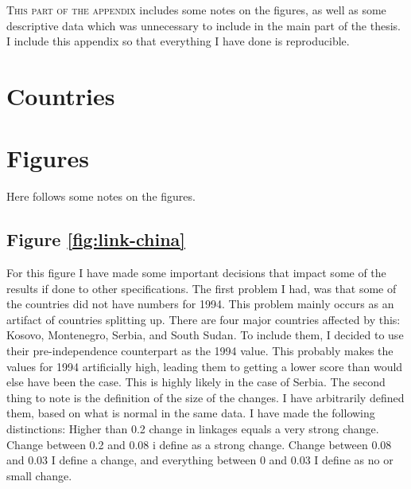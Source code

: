 \lettrine{T}{his part of the appendix} includes some notes on the figures, as well as some descriptive data which was unnecessary to include in the main part of the thesis. I include this appendix so that everything I have done is reproducible.

\section{Countries} \label{sec:countries}

\section{Figures}
Here follows some notes on the figures.

\subsection{Figure \ref{fig:link-china}}
For this figure I have made some important decisions that impact some of the results if done to other specifications. The first problem I had, was that some of the countries did not have numbers for 1994. This problem mainly occurs as an artifact of countries splitting up. There are four major countries affected by this: Kosovo, Montenegro, Serbia, and South Sudan. To include them, I decided to use their pre-independence counterpart as the 1994 value. This probably makes the values for 1994 artificially high, leading them to getting a lower score than would else have been the case. This is highly likely in the case of Serbia. The second thing to note is the definition of the size of the changes. I have arbitrarily defined them, based on what is normal in the same data. I have made the following distinctions: Higher than 0.2 change in linkages equals a very strong change. Change between 0.2 and 0.08 i define as a strong change. Change between 0.08 and 0.03 I define a change, and everything between 0 and 0.03 I define as no or small change. 